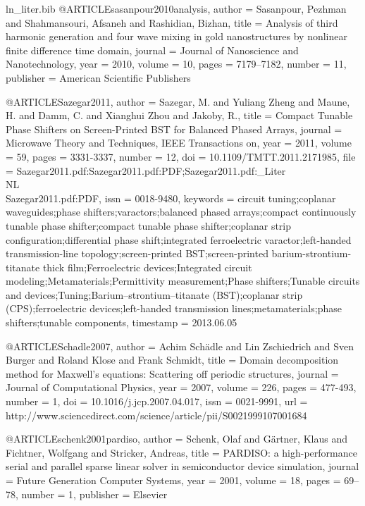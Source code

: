 \begin{filecontents*}{ln_liter.bib}
@ARTICLE{sasanpour2010analysis,
  author = {Sasanpour, Pezhman and Shahmansouri, Afsaneh and Rashidian, Bizhan},
  title = {Analysis of third harmonic generation and four wave mixing in gold
	nanostructures by nonlinear finite difference time domain},
  journal = {Journal of Nanoscience and Nanotechnology},
  year = {2010},
  volume = {10},
  pages = {7179--7182},
  number = {11},
  publisher = {American Scientific Publishers}
}

@ARTICLE{Sazegar2011,
  author = {Sazegar, M. and Yuliang Zheng and Maune, H. and Damm, C. and Xianghui
	Zhou and Jakoby, R.},
  title = {Compact Tunable Phase Shifters on Screen-Printed BST for Balanced
	Phased Arrays},
  journal = {Microwave Theory and Techniques, IEEE Transactions on},
  year = {2011},
  volume = {59},
  pages = {3331-3337},
  number = {12},
  doi = {10.1109/TMTT.2011.2171985},
  file = {Sazegar2011.pdf:Sazegar2011.pdf:PDF;Sazegar2011.pdf:_Liter\\NL\\Sazegar2011.pdf:PDF},
  issn = {0018-9480},
  keywords = {circuit tuning;coplanar waveguides;phase shifters;varactors;balanced
	phased arrays;compact continuously tunable phase shifter;compact
	tunable phase shifter;coplanar strip configuration;differential phase
	shift;integrated ferroelectric varactor;left-handed transmission-line
	topology;screen-printed BST;screen-printed barium-strontium-titanate
	thick film;Ferroelectric devices;Integrated circuit modeling;Metamaterials;Permittivity
	measurement;Phase shifters;Tunable circuits and devices;Tuning;Barium–strontium–titanate
	(BST);coplanar strip (CPS);ferroelectric devices;left-handed transmission
	lines;metamaterials;phase shifters;tunable components},
  timestamp = {2013.06.05}
}

@ARTICLE{Schadle2007,
  author = {Achim Sch\"adle and Lin Zschiedrich and Sven Burger and Roland Klose
	and Frank Schmidt},
  title = {Domain decomposition method for {M}axwell's equations: Scattering off
	periodic structures},
  journal = {Journal of Computational Physics},
  year = {2007},
  volume = {226},
  pages = {477-493},
  number = {1},
  doi = {10.1016/j.jcp.2007.04.017},
  issn = {0021-9991},
  url = {http://www.sciencedirect.com/science/article/pii/S0021999107001684}
}

@ARTICLE{schenk2001pardiso,
  author = {Schenk, Olaf and G{\"a}rtner, Klaus and Fichtner, Wolfgang and Stricker,
	Andreas},
  title = {{PARDISO}: a high-performance serial and parallel sparse linear solver
	in semiconductor device simulation},
  journal = {Future Generation Computer Systems},
  year = {2001},
  volume = {18},
  pages = {69--78},
  number = {1},
  publisher = {Elsevier}
}


\end{filecontents*}
